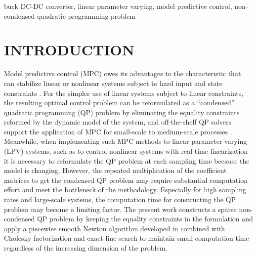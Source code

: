\documentclass[journal]{IEEEtran}
\begin{document}
\begin{IEEEkeywords}
buck DC-DC converter, linear parameter varying, model predictive control, non-condensed quadratic programming problem
\end{IEEEkeywords}


%
\IEEEpeerreviewmaketitle

\section{INTRODUCTION}
%
%
%
%
\IEEEPARstart
Model predictive control (MPC) owes its advantages to the characteristic that can stabilize linear or nonlinear systems subject to hard input and state constraints \cite{mayne2000constrained}. For the simpler use of linear systems subject to linear constraints, the resulting optimal control problem can be reformulated as a ``condensed'' quadratic programming (QP) problem by eliminating the equality constraints reformed by the dynamic model of the system, and off-the-shelf QP solvers support the application of MPC for small-scale to medium-scale processes \cite{rawlings2009model}. Meanwhile, when implementing such MPC methods to linear parameter varying (LPV) systems, such as to control nonlinear systems with real-time linearization it is necessary to reformulate the QP problem at each sampling time because the model is changing. However, the repeated multiplication of the coefficient matrices to get the condensed QP problem \cite{richards2015fast} may require substantial computation effort and meet the bottleneck of the methodology. Especially for high sampling rates and large-scale systems, the computation time for constructing the QP problem may become a limiting factor. The present work constructs a sparse non-condensed QP problem by keeping the equality constraints in the formulation \cite{rubagotti2014stabilizing} and apply a piecewise smooth Newton algorithm developed in \cite{li1997new} combined with Cholesky factorization and exact line search to maintain small computation time \cite{patrinos2011global} regardless of the increasing dimension of the problem.
\end{document}
